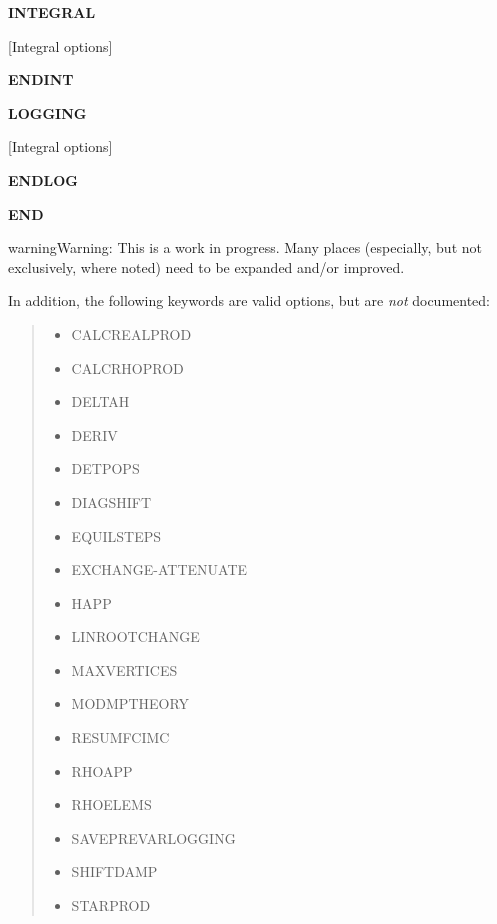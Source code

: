 \documentclass[openany,a4paper,10pt,english]{manual}
\begin{document}
\textbf{INTEGRAL}

{[}Integral options{]}

\textbf{ENDINT}

\textbf{LOGGING}

{[}Integral options{]}

\textbf{ENDLOG}

\textbf{END}

\begin{notice}{warning}{Warning:}
This is a work in progress.  Many places (especially, but not
exclusively, where noted) need to be expanded and/or improved.

In addition, the following keywords are valid options, but are
\emph{not} documented:
\begin{quote}
\begin{itemize}
\item {} 
CALCREALPROD

\item {} 
CALCRHOPROD

\item {} 
DELTAH

\item {} 
DERIV

\item {} 
DETPOPS

\item {} 
DIAGSHIFT

\item {} 
EQUILSTEPS

\item {} 
EXCHANGE-ATTENUATE

\item {} 
HAPP

\item {} 
LINROOTCHANGE

\item {} 
MAXVERTICES

\item {} 
MODMPTHEORY

\item {} 
RESUMFCIMC

\item {} 
RHOAPP

\item {} 
RHOELEMS

\item {} 
SAVEPREVARLOGGING

\item {} 
SHIFTDAMP

\item {} 
STARPROD


\end{itemize}
\end{quote}
\end{notice}
\end{document}
